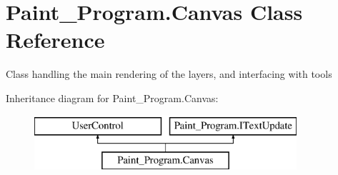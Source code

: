 \hypertarget{class_paint___program_1_1_canvas}{}\section{Paint\+\_\+\+Program.\+Canvas Class Reference}
\label{class_paint___program_1_1_canvas}


Class handling the main rendering of the layers, and interfacing with tools  


Inheritance diagram for Paint\+\_\+\+Program.\+Canvas\+:\begin{figure}[H]
\begin{center}
\leavevmode
\includegraphics[height=2.000000cm]{class_paint___program_1_1_canvas}
\end{center}
\end{figure}
